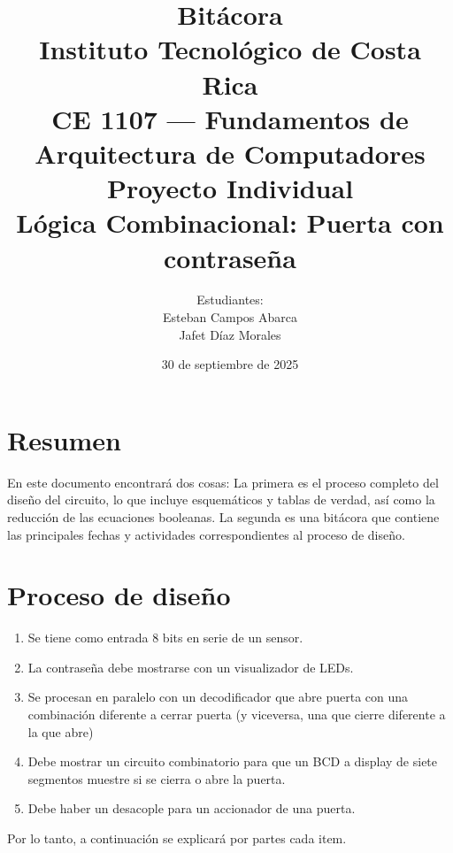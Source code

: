 \documentclass[12pt,a4paper]{article}
\begin{document}
    
\title{\textbf{Bitácora}\\
Instituto Tecnológico de Costa Rica \\
CE 1107 — Fundamentos de Arquitectura de Computadores\\
Proyecto Individual \\ Lógica Combinacional: Puerta con contraseña\\}
\author{Estudiantes:\\
Esteban Campos Abarca\\
Jafet Díaz Morales}
\date{30 de septiembre de 2025} %

\maketitle

\section{Resumen}

En este documento encontrará dos cosas: La primera es el proceso completo del diseño del circuito, lo que incluye esquemáticos y tablas de verdad, así como la reducción de las ecuaciones booleanas. La segunda es una bitácora que contiene las principales fechas y actividades correspondientes al proceso de diseño.

\section{Proceso de diseño}

\begin{enumerate}

    \item Se tiene como entrada 8 bits en serie de un sensor.
    \item La contraseña debe mostrarse con un visualizador de LEDs.
    \item Se procesan en paralelo con un decodificador que abre puerta con una combinación diferente a cerrar puerta (y viceversa, una que cierre diferente a la que abre)
    \item Debe mostrar un circuito combinatorio para que un BCD a display de siete segmentos muestre si se cierra o abre la puerta.
    \item Debe haber un desacople para un accionador de una puerta.
  
\end{enumerate}

Por lo tanto, a continuación se explicará por partes cada item.
\end{document}
